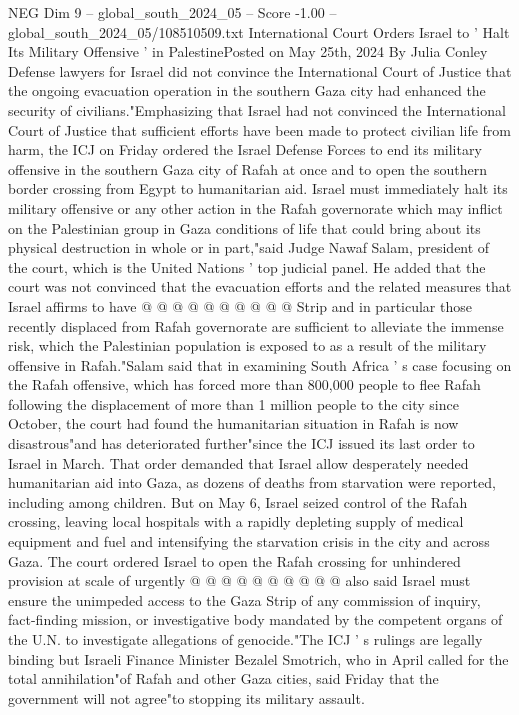 \begin{textsample}{NEG Dim 9 – global\_south\_2024\_05 – Score -1.00 – global\_south\_2024\_05/108510509.txt}  \label{ex:f9_neg_334}
International Court Orders Israel to ' Halt Its Military Offensive ' in PalestinePosted on May 25th, 2024 By Julia Conley Defense lawyers for Israel did not convince the International Court of Justice that the ongoing evacuation operation in the southern Gaza city had enhanced the security of civilians."Emphasizing that Israel had not convinced the International Court of Justice that sufficient efforts have been made to protect civilian life from harm, the ICJ on Friday ordered the Israel Defense Forces to end its military offensive in the southern Gaza city of Rafah at once and to open the southern border crossing from Egypt to humanitarian aid.
Israel must immediately halt its military offensive or any other action in the Rafah governorate which may inflict on the Palestinian group in Gaza conditions of life that could bring about its physical destruction in whole or in part,"said Judge Nawaf Salam, president of the court, which is the United Nations ' top judicial panel.
He added that the court was not convinced that the evacuation efforts and the related measures that Israel affirms to have @ @ @ @ @ @ @ @ @ @ Strip and in particular those recently displaced from Rafah governorate are sufficient to alleviate the immense risk, which the Palestinian population is exposed to as a result of the military offensive in Rafah."Salam said that in examining South Africa ' s case focusing on the Rafah offensive, which has forced more than 800,000 people to flee Rafah following the displacement of more than 1 million people to the city since October, the court had found the humanitarian situation in Rafah is now disastrous"and has deteriorated further"since the ICJ issued its last order to Israel in March.
That order demanded that Israel allow desperately needed humanitarian aid into Gaza, as dozens of deaths from starvation were reported, including among children.
But on May 6, Israel seized control of the Rafah crossing, leaving local hospitals with a rapidly depleting supply of medical equipment and fuel and intensifying the starvation crisis in the city and across Gaza.
The court ordered Israel to open the Rafah crossing for unhindered provision at scale of urgently @ @ @ @ @ @ @ @ @ @ also said Israel must ensure the unimpeded access to the Gaza Strip of any commission of inquiry, fact-finding mission, or investigative body mandated by the competent organs of the U.N. to investigate allegations of genocide."The ICJ ' s rulings are legally binding but Israeli Finance Minister Bezalel Smotrich, who in April called for the total annihilation"of Rafah and other Gaza cities, said Friday that the government will not agree"to stopping its military assault.

\end{textsample}
